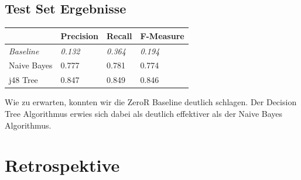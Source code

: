 \documentclass[]{article}
\begin{document}
\subsection{Test Set Ergebnisse}
\begin{table}[h]
\begin{tabular}{l|lll}
                  & Precision      & Recall         & F-Measure      \\ \hline
\textit{Baseline} & \textit{0.132} & \textit{0.364} & \textit{0.194} \\ \hline
Naive Bayes       & 0.777          & 0.781          & 0.774          \\
j48 Tree          & 0.847      	   & 0.849            & 0.846          
\end{tabular}
\end{table}

Wie zu erwarten, konnten wir die ZeroR Baseline deutlich schlagen. 
Der Decision Tree Algorithmus erwies sich dabei als deutlich effektiver als der Naive Bayes Algorithmus.



\section{Retrospektive}


\end{document}
